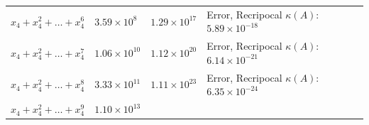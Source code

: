 \documentclass[
]{article}
\begin{document}
\begin{longtable}[]{@{}llll@{}}
\begin{minipage}[t]{0.23\columnwidth}\raggedright
\(x_{4}+x_{4}^{2}+\dots+x_{4}^{6}\)\strut
\end{minipage} & \begin{minipage}[t]{0.15\columnwidth}\raggedright
\(3.59 \times 10^{8}\)\strut
\end{minipage} & \begin{minipage}[t]{0.15\columnwidth}\raggedright
\(1.29 \times 10^{17}\)\strut
\end{minipage} & \begin{minipage}[t]{0.36\columnwidth}\raggedright
Error, Recripocal \(\kappa(A)\): \(5.89 \times 10^{-18}\)\strut
\end{minipage}\tabularnewline
\begin{minipage}[t]{0.23\columnwidth}\raggedright
\(x_{4}+x_{4}^{2}+\dots+x_{4}^{7}\)\strut
\end{minipage} & \begin{minipage}[t]{0.15\columnwidth}\raggedright
\(1.06 \times 10^{10}\)\strut
\end{minipage} & \begin{minipage}[t]{0.15\columnwidth}\raggedright
\(1.12 \times 10^{20}\)\strut
\end{minipage} & \begin{minipage}[t]{0.36\columnwidth}\raggedright
Error, Recripocal \(\kappa(A)\): \(6.14 \times 10^{-21}\)\strut
\end{minipage}\tabularnewline
\begin{minipage}[t]{0.23\columnwidth}\raggedright
\(x_{4}+x_{4}^{2}+\dots+x_{4}^{8}\)\strut
\end{minipage} & \begin{minipage}[t]{0.15\columnwidth}\raggedright
\(3.33 \times 10^{11}\)\strut
\end{minipage} & \begin{minipage}[t]{0.15\columnwidth}\raggedright
\(1.11 \times 10^{23}\)\strut
\end{minipage} & \begin{minipage}[t]{0.36\columnwidth}\raggedright
Error, Recripocal \(\kappa(A)\): \(6.35 \times 10^{-24}\)\strut
\end{minipage}\tabularnewline
\begin{minipage}[t]{0.23\columnwidth}\raggedright
\(x_{4}+x_{4}^{2}+\dots+x_{4}^{9}\)\strut
\end{minipage} & \begin{minipage}[t]{0.15\columnwidth}\raggedright
\(1.10 \times 10^{13}\)\strut

\end{minipage}
\end{longtable}
\end{document}
